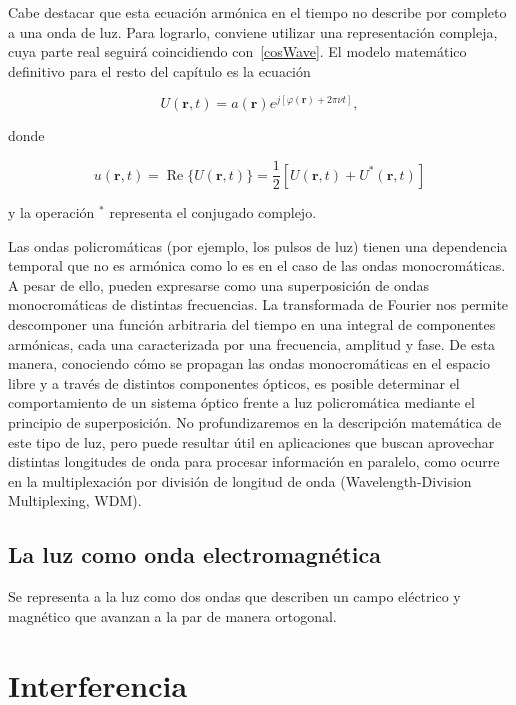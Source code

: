 \documentclass[12pt,a4paper]{report}
\begin{document}
Cabe destacar que esta ecuación armónica en el tiempo no describe por completo a una onda de luz. Para lograrlo, conviene utilizar una representación compleja, cuya parte real seguirá coincidiendo con~\ref{cosWave}. El modelo matemático definitivo para el resto del capítulo es la ecuación

{
\Large
\begin{equation}
\label{complexWave}
    U(\mathbf{r},t)
    = a(\mathbf{r})e^{j[\varphi(\mathbf{r})+2\pi\nu t]},
\end{equation}
}

\noindent
donde

{
\large
\begin{equation}
    u(\mathbf{r},t) = \operatorname{Re}\{U(\mathbf{r},t)\}
    = \frac{1}{2}\left[U(\mathbf{r},t) + U^*(\mathbf{r},t)\right]
\end{equation}
}

\noindent
y la operación $^*$ representa el conjugado complejo.

Las ondas policromáticas (por ejemplo, los pulsos de luz) tienen una dependencia temporal que no es armónica como lo es en el caso de las ondas monocromáticas. A pesar de ello, pueden expresarse como una superposición de ondas monocromáticas de distintas frecuencias. La transformada de Fourier nos permite descomponer una función arbitraria del tiempo en una integral de componentes armónicas, cada una caracterizada por una frecuencia, amplitud y fase. De esta manera, conociendo cómo se propagan las ondas monocromáticas en el espacio libre y a través de distintos componentes ópticos, es posible determinar el comportamiento de un sistema óptico frente a luz policromática mediante el principio de superposición. No profundizaremos en la descripción matemática de este tipo de luz, pero puede resultar útil en aplicaciones que buscan aprovechar distintas longitudes de onda para procesar información en paralelo, como ocurre en la multiplexación por división de longitud de onda (Wavelength-Division Multiplexing, WDM).

\subsection{La luz como onda electromagnética}

Se representa a la luz como dos ondas que describen un campo eléctrico y magnético que avanzan a la par de manera ortogonal. 

\section{Interferencia}
\end{document}
